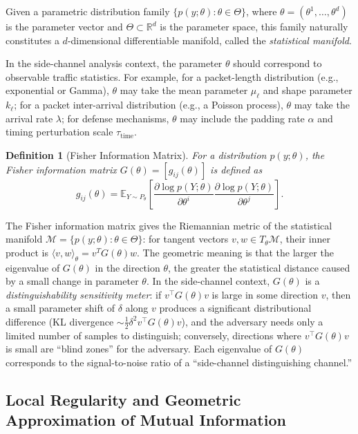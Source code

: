\documentclass[10pt,a4paper]{amsart}
\newtheorem{definition}{Definition}
\newcommand{\E}{\mathbb{E}}
\newcommand{\R}{\mathbb{R}}
\begin{document}
Given a parametric distribution family
$\{p(y;\theta) : \theta\in\Theta\}$, where
$\theta=(\theta^1,\ldots,\theta^d)$ is the parameter vector and
$\Theta\subset\R^d$ is the parameter space, this family naturally
constitutes a $d$-dimensional differentiable manifold, called the
\emph{statistical manifold}.

In the side-channel analysis context, the parameter $\theta$ should
correspond to observable traffic statistics.
For example, for a packet-length distribution (e.g., exponential or Gamma),
$\theta$ may take the mean parameter $\mu_{\ell}$ and shape parameter
$k_{\ell}$; for a packet inter-arrival distribution (e.g., a Poisson
process), $\theta$ may take the arrival rate $\lambda$; for defense
mechanisms, $\theta$ may include the padding rate $\alpha$ and timing
perturbation scale $\tau_{\mathrm{time}}$.

\begin{definition}[Fisher Information Matrix]\label{def:fim}
For a distribution $p(y;\theta)$, the Fisher information matrix
$G(\theta)=[g_{ij}(\theta)]$ is defined as
\begin{equation}\label{eq:fim}
g_{ij}(\theta) = \E_{Y\sim P_\theta}\!\left[\frac{\partial\log p(Y;\theta)}{\partial\theta^i}
\frac{\partial\log p(Y;\theta)}{\partial\theta^j}\right].
\end{equation}
\end{definition}

The Fisher information matrix gives the Riemannian metric of the
statistical manifold
$\mathcal{M}=\{p(y;\theta):\theta\in\Theta\}$:
for tangent vectors $v,w\in T_\theta\mathcal{M}$, their inner product is
$\langle v,w\rangle_\theta = v^T G(\theta) w$.
The geometric meaning is that the larger the eigenvalue of $G(\theta)$ in
the direction $\theta$, the greater the statistical distance caused by a
small change in parameter $\theta$.
In the side-channel context, $G(\theta)$ is a \emph{distinguishability
sensitivity meter}: if $v^\top G(\theta)v$ is large in some direction $v$,
then a small parameter shift of $\delta$ along $v$ produces a significant
distributional difference (KL divergence $\sim\frac{1}{2}\delta^2 v^\top G(\theta)v$),
and the adversary needs only a limited number of samples to distinguish;
conversely, directions where $v^\top G(\theta)v$ is small are ``blind
zones'' for the adversary.
Each eigenvalue of $G(\theta)$ corresponds to the signal-to-noise ratio
of a ``side-channel distinguishing channel.''

\subsection{Local Regularity and Geometric Approximation of Mutual Information}
\end{document}
